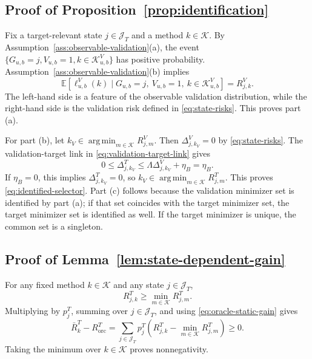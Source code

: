 \documentclass[a4paper, 12pt]{article}
\theoremstyle{plain}
\theoremstyle{remark}
\DeclareMathOperator*{\argmin}{arg\,min}
\newcommand{\E}{\mathbb{E}}
\newcommand{\Kcal}{\mathcal{K}}
\newcommand{\1}{\mathbf{1}}
\begin{document}
\subsection*{Proof of Proposition~\ref{prop:identification}}
Fix a target-relevant state \(j\in\mathcal J_T\) and a method \(k\in\Kcal\). By Assumption~\ref{ass:observable-validation}(a), the event \(\{G_{u,b}=j,V_{u,b}=1,k\in\Kcal^V_{u,b}\}\) has positive probability. Assumption~\ref{ass:observable-validation}(b) implies
\begin{equation*}
    \E\!\left[\ell^V_{u,b}(k)\mid G_{u,b}=j,\ V_{u,b}=1,\ k\in\Kcal^V_{u,b}\right]
    =R^V_{j,k} .
\end{equation*}
The left-hand side is a feature of the observable validation distribution, while the right-hand side is the validation risk defined in \eqref{eq:state-risks}. This proves part (a).

For part (b), let \(k_V\in\argmin_{m\in\Kcal}R^V_{j,m}\). Then \(\Delta^V_{j,k_V}=0\) by \eqref{eq:state-risks}. The validation-target link in \eqref{eq:validation-target-link} gives
\begin{equation*}
    0\leq \Delta^T_{j,k_V}\leq \Lambda\Delta^V_{j,k_V}+\eta_B=\eta_B .
\end{equation*}
If \(\eta_B=0\), this implies \(\Delta^T_{j,k_V}=0\), so \(k_V\in\argmin_{m\in\Kcal}R^T_{j,m}\). This proves \eqref{eq:identified-selector}. Part (c) follows because the validation minimizer set is identified by part (a); if that set coincides with the target minimizer set, the target minimizer set is identified as well. If the target minimizer is unique, the common set is a singleton.

\subsection*{Proof of Lemma~\ref{lem:state-dependent-gain}}
For any fixed method \(k\in\Kcal\) and any state \(j\in\mathcal J_T\),
\begin{equation*}
    R^T_{j,k}\geq \min_{m\in\Kcal}R^T_{j,m} .
\end{equation*}
Multiplying by \(p^T_j\), summing over \(j\in\mathcal J_T\), and using \eqref{eq:oracle-static-gain} gives
\begin{equation*}
    \bar R^T_k-R^T_{\mathrm{orc}}
    =
    \sum_{j\in\mathcal J_T}p^T_j
    \left(R^T_{j,k}-\min_{m\in\Kcal}R^T_{j,m}\right)
    \geq0 .
\end{equation*}
Taking the minimum over \(k\in\Kcal\) proves nonnegativity.
\end{document}
